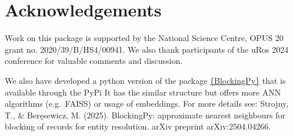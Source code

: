 \section{Acknowledgements}\label{acknowledgements}

Work on this package is supported by the National Science Centre, OPUS
20 grant no. 2020/39/B/HS4/00941. We also thank participants of the uRos
2024 conference for valuable comments and discussion.

We also have developed a python version of the package
\href{https://blockingpy.readthedocs.io/en/latest/}{\{BlockingPy\}} that is
available through the PyPi It has the similar structure but offers more
ANN algorithms (e.g.~FAISS) or usage of embeddings. For more details
see: Strojny, T., \& Beręsewicz, M. (2025). BlockingPy: approximate
nearest neighbours for blocking of records for entity resolution. arXiv
preprint arXiv:2504.04266.



\address{%
Maciej Beręsewicz\\
University of Economics and BusinessStatisical Office in Poznań\\%
Department of Statistics, Poznań, Poland\\ Centre for the Methodology of Population Studies\\
%
\url{https://maciejberesewicz.com}\\%
\textit{ORCiD: \href{https://orcid.org/0000-0002-8281-4301}{0000-0002-8281-4301}}\\%
\href{mailto:maciej.beresewicz@poznan.pl}{\nolinkurl{maciej.beresewicz@poznan.pl}}%
}

\address{%
Adam Struzik\\
Adam Mickiewicz UniversityStatisical Office in Poznań\\%
Faculty of Mathematics and Computer Science, Poznań, Poland\\ Centre for Urban Statistics\\
%
%
%
\href{mailto:adastr5@st.amu.edu.pl}{\nolinkurl{adastr5@st.amu.edu.pl}}%
}
